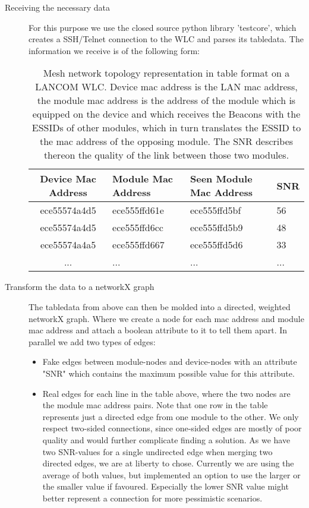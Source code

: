       \begin{description}
	\item[Receiving the necessary data]
	  For this purpose we use the closed source python library 'testcore', which creates a SSH/Telnet connection to the WLC and parses its tabledata.
	  The information we receive is of the following form:
	  
	  \begin{table}[p]
	    \begin{tabular}{clll}
	      Device Mac Address & Module Mac Address & Seen Module Mac Address & \ac{SNR}\\ \hline
	      ece55574a4d5 & ece555ffd61e & ece555ffd5bf & 56 \\
	      ece55574a4d5 & ece555ffd6cc & ece555ffd5b9 & 48 \\
	      ece55574a4a5 & ece555ffd667 & ece555ffd5d6 & 33 \\
	      ... & ... & ... & ...
	    \end{tabular}
	    \caption{Mesh network topology representation in table format on a LANCOM WLC. Device mac address is the LAN mac address, the module mac address is
	      the address of the module which is equipped on the device and which receives the Beacons with the ESSIDs of other modules, which in turn translates
	      the ESSID to the mac address of the opposing module. The \ac{SNR} describes thereon the quality of the link between those two modules.}
	    \label{tab:wlc}
	  \end{table}
	
	\item [Transform the data to a networkX graph]
	  The tabledata from above can then be molded into a directed, weighted networkX graph. Where we create a node for each mac address and module mac address and attach a boolean
	  attribute to it to tell them apart. 
	  In parallel we add two types of edges:

	  \begin{itemize}
	    \item Fake edges between module-nodes and device-nodes with an attribute "SNR" which contains the maximum possible value for this attribute.
	    
	    \item Real edges for each line in the table above, where the two nodes are the module mac address pairs. 
	      Note that one row in the table represents just a directed edge from one module to the other. We only respect two-sided connections,
	      since one-sided edges are mostly of poor quality and would further complicate finding a solution.
	      As we have two SNR-values for a single undirected edge when merging two directed edges, we are at liberty to chose.
	      Currently we are using the average of both values, but implemented an option to use the larger or the smaller value if favoured.
	      Especially the lower SNR value might better represent a connection for more pessimistic scenarios.
	  \end{itemize}


\end{description}

